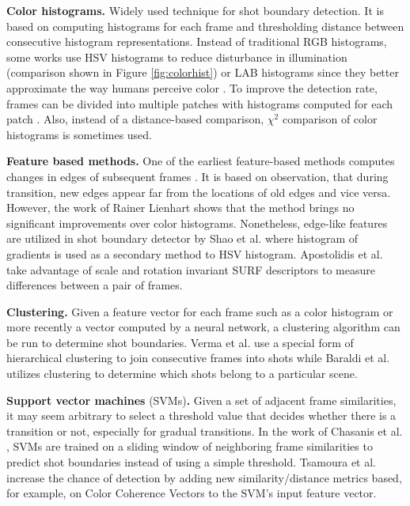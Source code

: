 \begin{description}[labelwidth=1em, leftmargin=!]
    \item \textbf{Color histograms.} Widely used technique for shot boundary detection. It is based on computing histograms for each frame and thresholding distance between consecutive histogram representations. Instead of traditional RGB histograms, some works use HSV histograms to reduce disturbance in illumination \cite{LingGeneralMethodforSBD} (comparison shown in Figure \ref{fig:colorhist}) or LAB histograms since they better approximate the way humans perceive color \cite{Fuzzycolorhistogram}. To improve the detection rate, frames can be divided into multiple patches with histograms computed for each patch \cite{Cineast}. Also, instead of a distance-based comparison, $\chi^2$ comparison of color histograms is sometimes used.

    \item \textbf{Feature based methods.} One of the earliest feature-based methods computes changes in edges of subsequent frames \cite{zabih1995feature}. It is based on observation, that during transition, new edges appear far from the locations of old edges and vice versa. However, the work of Rainer Lienhart \cite{LienhartComparison1998} shows that the method brings no significant improvements over color histograms. Nonetheless, edge-like features are utilized in shot boundary detector by Shao et al. \cite{shao15} where histogram of gradients is used as a secondary method to HSV histogram. Apostolidis et al. \cite{apostolidis14} take advantage of scale and rotation invariant SURF descriptors \cite{surf} to measure differences between a pair of frames.
    
    \item \textbf{Clustering.} Given a feature vector for each frame such as a color histogram or more recently a vector computed by a neural network, a clustering algorithm can be run to determine shot boundaries. Verma et al. \cite{VermaClustering} use a special form of hierarchical clustering to join consecutive frames into shots while Baraldi et al. \cite{BaraldiScenes} utilizes clustering to determine which shots belong to a particular scene.

    \item \textbf{Support vector machines} (SVMs)\textbf{.} Given a set of adjacent frame similarities, it may seem arbitrary to select a threshold value that decides whether there is a transition or not, especially for gradual transitions. In the work of Chasanis et al. \cite{ChasanisSVM}, SVMs are trained on a sliding window of neighboring frame similarities to predict shot boundaries instead of using a simple threshold. Tsamoura et al. \cite{TsamouraSVM} increase the chance of detection by adding new similarity/distance metrics based, for example, on Color Coherence Vectors \cite{pass1997comparing} to the SVM's input feature vector.


\end{description}
